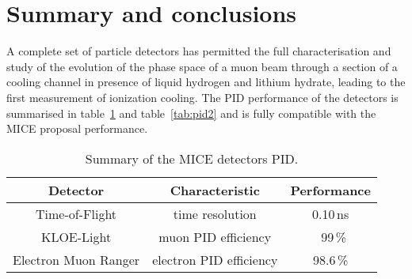 \graphicspath{{80-Conclusions/Figures/}}

\section{Summary and conclusions}
\label{Sect:Conclusions}

A complete set of particle detectors has permitted the full characterisation and study of the evolution of the phase space of a muon beam through a section of a cooling channel in presence of liquid hydrogen and lithium hydrate, leading to the first measurement of ionization cooling.
The PID performance of the detectors is summarised in table~\ref{tab:pid1} and table~\ref{tab:pid2} and is fully compatible with the MICE proposal performance.

\begin{table}[htb!]
	\caption{Summary of the MICE detectors PID.}
  \begin{center}
	\begin{tabular}{|c|c|c|}
   	\hline
	  \textbf{Detector}              & \textbf{Characteristic}            & \textbf{Performance} \\
		\hline
    Time-of-Flight        & time resolution           & 0.10\,ns    \\
    KLOE-Light            & muon PID efficiency       & ~99\,\%       \\
    Electron Muon Ranger  & electron PID efficiency   & 98.6\,\%      \\
    \hline
  \end{tabular}
	\label{tab:pid1}
  \end{center}
\end{table}

